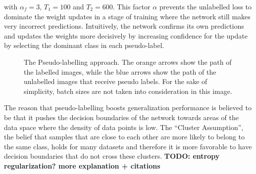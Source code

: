 \noindent with $\alpha_f = 3$, $T_1 = 100$ and $T_2 = 600$. This factor $\alpha$ prevents the unlabelled loss to dominate the weight updates in a stage of training where the network still makes very incorrect predictions. Intuitively, the network confirms its own predictions and updates the weights more decisively by increasing confidence for the update by selecting the dominant class in each pseudo-label.\\

\begin {figure}[!ht]
	\begin{center}
		\scalebox{0.45}{}
	\end{center}

		\caption[Pseudo-Labelling.]{The Pseudo-labelling approach. The orange arrows show the path of the labelled images, while the blue arrows show the path of the unlabelled images that receive pseudo labels. For the sake of simplicity, batch sizes are not taken into consideration in this image.}
		\label{fig:pseudo_label}
\end {figure}

The reason that pseudo-labelling boosts generalization performance is believed to be that it pushes the decision boundaries of the network towards areas of the data space where the density of data points is low. The ``Cluster Assumption'', the belief that samples that are close to each other are more likely to belong to the same class, holds for many datasets and therefore it is more favorable to have decision boundaries that do not cross these clusters. \textbf{TODO: entropy regularization? more explanation + citations}